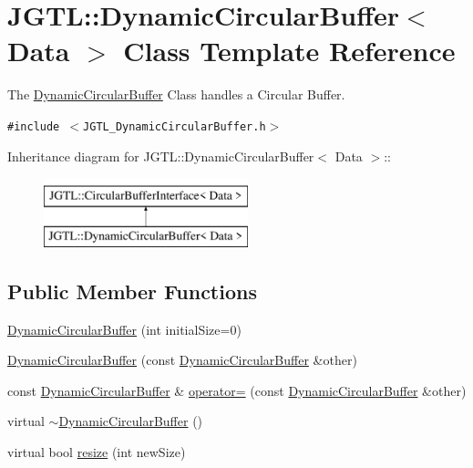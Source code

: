 \hypertarget{class_j_g_t_l_1_1_dynamic_circular_buffer}{
\section{JGTL::Dynamic\-Circular\-Buffer$<$ Data $>$ Class Template Reference}
\label{class_j_g_t_l_1_1_dynamic_circular_buffer}
}
The \hyperlink{class_j_g_t_l_1_1_dynamic_circular_buffer}{Dynamic\-Circular\-Buffer} Class handles a Circular Buffer.  


{\tt \#include $<$JGTL\_\-Dynamic\-Circular\-Buffer.h$>$}

Inheritance diagram for JGTL::Dynamic\-Circular\-Buffer$<$ Data $>$::\begin{figure}[H]
\begin{center}
\leavevmode
\includegraphics[height=2cm]{class_j_g_t_l_1_1_dynamic_circular_buffer}
\end{center}
\end{figure}
\subsection*{Public Member Functions}
\begin{CompactItemize}
\item 
\hyperlink{class_j_g_t_l_1_1_dynamic_circular_buffer_32e925536e7628b1e5a088300def83a5}{Dynamic\-Circular\-Buffer} (int initial\-Size=0)
\item 
\hyperlink{class_j_g_t_l_1_1_dynamic_circular_buffer_dff0297e4ca67ed7f7a9078579b2cc3f}{Dynamic\-Circular\-Buffer} (const \hyperlink{class_j_g_t_l_1_1_dynamic_circular_buffer}{Dynamic\-Circular\-Buffer} \&other)
\item 
const \hyperlink{class_j_g_t_l_1_1_dynamic_circular_buffer}{Dynamic\-Circular\-Buffer} \& \hyperlink{class_j_g_t_l_1_1_dynamic_circular_buffer_9a409b912e902f65ae09babd635b8d6e}{operator=} (const \hyperlink{class_j_g_t_l_1_1_dynamic_circular_buffer}{Dynamic\-Circular\-Buffer} \&other)
\item 
virtual \hyperlink{class_j_g_t_l_1_1_dynamic_circular_buffer_128034b920124c7f5d6d9e5da0e2050f}{$\sim$Dynamic\-Circular\-Buffer} ()
\item 
virtual bool \hyperlink{class_j_g_t_l_1_1_dynamic_circular_buffer_2ea8f91e985c5fec04eb8ef05898240a}{resize} (int new\-Size)
\end{CompactItemize}
